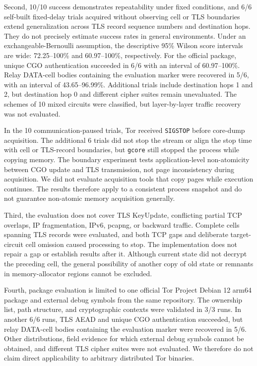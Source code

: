 \documentclass[10pt,a4paper]{article}
\newcommand{\code}[1]{\nolinkurl{#1}}
\begin{document}
Second, 10/10 success demonstrates repeatability under fixed conditions, and 6/6 self-built fixed-delay trials acquired without observing cell or TLS boundaries extend generalization across TLS record sequence numbers and destination hops. They do not precisely estimate success rates in general environments. Under an exchangeable-Bernoulli assumption, the descriptive 95\% Wilson score intervals are wide: 72.25--100\% and 60.97--100\%, respectively. For the official package, unique CGO authentication succeeded in 6/6 with an interval of 60.97--100\%. Relay DATA-cell bodies containing the evaluation marker were recovered in 5/6, with an interval of 43.65--96.99\%. Additional trials include destination hops 1 and 2, but destination hop 0 and different cipher suites remain unevaluated. The schemes of 10 mixed circuits were classified, but layer-by-layer traffic recovery was not evaluated.

In the 10 communication-paused trials, Tor received \code{SIGSTOP} before core-dump acquisition. The additional 6 trials did not stop the stream or align the stop time with cell or TLS-record boundaries, but \code{gcore} still stopped the process while copying memory. The boundary experiment tests application-level non-atomicity between CGO update and TLS transmission, not page inconsistency during acquisition. We did not evaluate acquisition tools that copy pages while execution continues. The results therefore apply to a consistent process snapshot and do not guarantee non-atomic memory acquisition generally.

Third, the evaluation does not cover TLS KeyUpdate, conflicting partial TCP overlaps, IP fragmentation, IPv6, pcapng, or backward traffic. Complete cells spanning TLS records were evaluated, and both TCP gaps and deliberate target-circuit cell omission caused processing to stop. The implementation does not repair a gap or establish results after it. Although current state did not decrypt the preceding cell, the general possibility of another copy of old state or remnants in memory-allocator regions cannot be excluded.

Fourth, package evaluation is limited to one official Tor Project Debian 12 arm64 package and external debug symbols from the same repository. The ownership list, path structure, and cryptographic contexts were validated in 3/3 runs. In another 6/6 runs, TLS AEAD and unique CGO authentication succeeded, but relay DATA-cell bodies containing the evaluation marker were recovered in 5/6. Other distributions, field evidence for which external debug symbols cannot be obtained, and different TLS cipher suites were not evaluated. We therefore do not claim direct applicability to arbitrary distributed Tor binaries.
\end{document}

